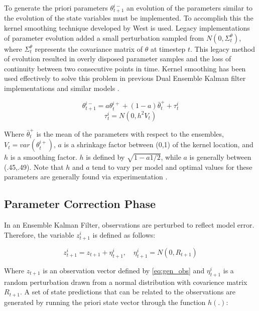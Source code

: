 To generate the priori parameters $\theta^{i-}_{t+1}$ an evolution of the parameters similar to the evolution of the state variables must be implemented. To accomplish this the kernel smoothing technique developed by West\cite{West1993} is used. Legacy implementations of parameter evolution added a small perturbation sampled from $N(0,\Sigma^{\theta}_{t})$, where $\Sigma^{\theta}_{t}$ represents the covariance matrix of $\theta$ at timestep $t$. This legacy method of evolution resulted in overly disposed parameter samples and the loss of continuity between two consecutive points in time\cite{Chen2008}. Kernel smoothing has been used effectively to solve this problem in previous Dual Ensemble Kalman filter implementations \cite{Moradkhani2005} and similar models \cite{Chen2008}.

\begin{equation}\label{eq:dekf_thetaminus}
\theta_{t+1}^{i-} = a\theta_{t}^{i+} + (1-a)\bar{\theta}_{t}^{+} + \tau_{t}^{i}
\end{equation}
\begin{equation}\label{eq:dekf_tau}
\tau_{t}^{i} = N(0, h^{2}V_{t})
\end{equation}
 
Where $\bar{\theta}_{t}^{+}$ is the mean of the parameters with respect to the ensembles, $V_{t} = var(\theta_{t}^{i+})$, $a$ is a shrinkage factor between (0,1) of the kernel location, and $h$ is a smoothing factor. $h$ is defined by $\sqrt{1-a1/2}$, while $a$ is generally between (.45,.49). Note that $h$ and $a$ tend to vary per model and optimal values for these parameters are generally found via experimentation  \cite{Moradkhani2005}  \cite{Anderson1999} \cite{Annan2005} \cite{Chen2008}.

\subsection{Parameter Correction Phase}

In an Ensemble Kalman Filter, observations are perturbed to reflect model error. Therefore, the variable $z_{t+1}^{i}$ is defined as follows:

\begin{equation}\label{eq:dekf_obs}
z_{t+1}^{i} = z_{t+1} + \eta_{t+1}^{i},\quad \eta_{t+1}^{i} = N(0,R_{t+1})
\end{equation}

Where $z_{t+1}$ is an observation vector defined by \eqref{eq:gen_obs} and $\eta_{t+1}^{i}$ is a random perturbation drawn from a normal distribution with covarience matrix $R_{t+1}$. A set of state predictions that can be related to the observations are generated by running the priori state vector through the function $h(.)$:

